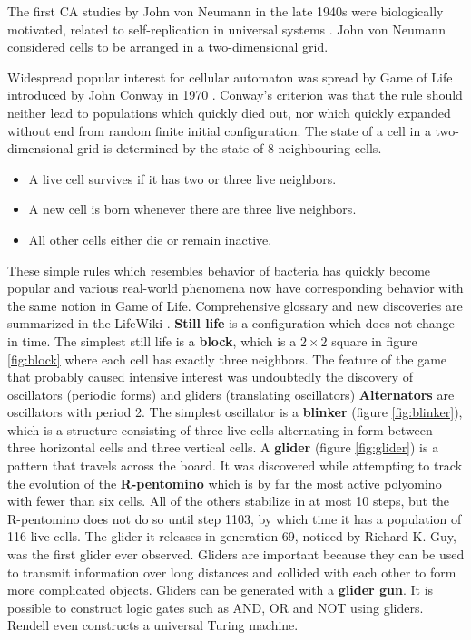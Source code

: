 The first CA studies by John von Neumann in the late 1940s were biologically motivated, related to self-replication in universal systems \cite{Neumann66Cellular}. John von Neumann considered cells to be arranged in a two-dimensional grid.

Widespread popular interest for cellular automaton was spread by Game of Life introduced by John Conway in 1970 \cite{Gardner70Life}. Conway’s criterion was that the rule should neither lead to populations which quickly died out, nor which quickly expanded without end from random finite initial configuration. The state of a cell in a two-dimensional grid is determined by the state of 8 neighbouring cells.

\begin{itemize}
  \item A live cell survives if it has two or three live neighbors.
  \item A new cell is born whenever there are three live neighbors.
  \item All other cells either die or remain inactive.
\end{itemize}

These simple rules which resembles behavior of bacteria has quickly become popular and various real-world phenomena now have corresponding behavior with the same notion in Game of Life. Comprehensive glossary and new discoveries are summarized in the LifeWiki \cite{LifeWiki}.
{\bf Still life} is a configuration which does not change in time. The simplest still life is a {\bf block}, which is a $2\times 2$ square in figure \ref{fig:block} where each cell has exactly three neighbors.
The feature of the game that probably caused intensive interest was undoubtedly the discovery of oscillators (periodic forms) and gliders (translating oscillators)
{\bf Alternators} are oscillators with period 2. The simplest oscillator is a {\bf blinker} (figure \ref{fig:blinker}), which is a structure consisting of three live cells alternating in form between three horizontal cells and three vertical cells.
A {\bf glider} (figure \ref{fig:glider}) is a pattern that travels across the board. It was discovered while attempting to track the evolution of the {\bf R-pentomino} which is by far the most active polyomino with fewer than six cells. All of the others stabilize in at most 10 steps, but the R-pentomino does not do so until step 1103, by which time it has a population of 116 live cells. The glider it releases in generation 69, noticed by Richard K. Guy, was the first glider ever observed. Gliders are important because they can be used to transmit information over long distances and collided with each other to form more complicated objects. Gliders can be generated with a {\bf glider gun}. It is possible to construct logic gates such as AND, OR and NOT using gliders. Rendell \cite{Rendell15LifeUniversal} even constructs a universal Turing machine.

